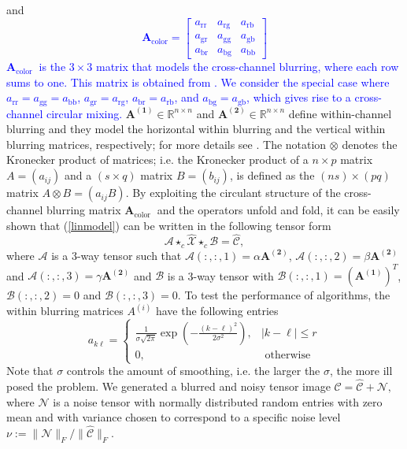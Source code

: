 \documentclass{siamltex}
\newcommand{\1}{\mathbb{1}}
\newcommand{\0}{\mathbb{0}}
\begin{document}
	and 
	\textcolor{blue}{	$$\mathbf{A}_{\mathrm{color}}=\left[\begin{array}{ccc}
	a_{\text{rr}} & a_{\text{rg}}& a_{\text{rb}} \\
	a_{\text{gr}} & a_{\text{gg}} & a_{\text{gb}} \\
	a_{\text{br}} & a_{\text{bg}} & a_{\text{bb}}
	\end{array}\right]$$
	$\mathbf{A}_{\text {color }}$ is the $3\times3$ matrix that models the  cross-channel blurring, where each row sums to one. This matrix is obtained from \cite{HNO}. We consider the special case where $a_{\text{rr}}=a_{\text{gg}}=a_{\text{bb}}$, $a_{\text{gr}}=a_{\text{rg}}$, $a_{\text{br}}=a_{\text{rb}}$, and $a_{\text{bg}}=a_{\text{gb}}$, which gives rise to a cross-channel  circular mixing. } $\mathbf{A^{(1)}}\in\mathbb{R}^{n\times n}$ and $\mathbf{A^{(2)}}\in\mathbb{R}^{n\times n}$ define within-channel blurring and they model
	the horizontal within blurring and the vertical  within blurring matrices, respectively; for more details see \cite{HNO}. The notation $\otimes$ denotes the Kronecker product of  matrices; i.e. the Kronecker product of a $n\times p$  matrix $A=(a_{ij})$  and a $(s\times q)$ matrix
	$B=(b_{ij})$,   is defined as the $(ns)\times(pq)$ matrix $A \otimes B = (a_{ij}B)$. By exploiting  the circulant structure  of the cross-channel blurring matrix $\mathbf{A}_{\text {color }}$ and the operators unfold and fold, it can be easily shown that (\ref{linmodel}) can be written in the following tensor form
	\begin{equation}\label{tensor_form}
	\mathscr {A}\star_c \widehat{\mathscr{X}}\star_c \mathscr{B}= \widehat{\mathscr{C}},
	\end{equation}
	where $\mathscr {A}$ is a 3-way tensor such that  $\mathscr {A}(:,:,1)=\alpha \mathbf{A^{(2)}}$, $\mathscr {A}(:,:,2)=\beta \mathbf{A^{(2)}}$ and $\mathscr {A}(:,:,3)=\gamma \mathbf{A^{(2)}}$ and  $\mathscr {B}$ is a 3-way tensor with $\mathscr {B}(:,:,1)=(\mathbf{A^{(1)}})^T$, $\mathscr {B}(:,:,2)=0$ and $\mathscr {B}(:,:,3)=0$. To test the performance of algorithms, the within blurring matrices $A^{(i)}$  have the following
	entries 
	$$a_{k \ell}=\left\{\begin{array}{ll}
	\frac{1}{\sigma \sqrt{2 \pi}} \exp \left(-\frac{(k-\ell)^{2}}{2 \sigma^{2}}\right), & |k-\ell| \leq r \\
	0, & \text { otherwise }
	\end{array}\right.$$
	Note  that $\sigma$ controls the amount of smoothing, i.e. the larger the $\sigma$,  the more ill posed the problem.  We generated a blurred and noisy tensor image $\mathscr{C}=\widehat{\mathscr{C}}+\mathscr{N},$ where $\mathscr{N}$ is a noise tensor with normally distributed random entries with zero mean and with variance chosen to correspond to a specific noise level $\nu:=\|\mathscr{N}\|_F /\|\widehat{\mathscr{C}}\|_F.$
\end{document}
